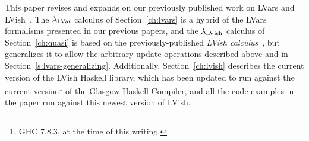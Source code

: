\fi

\ifdefined\JOURNAL

This paper revises and expands on our previously published work on
LVars and LVish~\cite{Freeze-paper, LVars-paper, effectzoo}.
The $\lambda_{\textrm{LVar}}$ calculus of Section~\ref{ch:lvars}
is a hybrid of the LVars formalisms presented in our previous papers,
and the $\lambda_{\textrm{LVish}}$ calculus of Section~\ref{ch:quasi} is based on
the previously-published \emph{LVish calculus}~\cite{Freeze-paper},
but generalizes it to allow the arbitrary update operations  described
above and in Section~\ref{s:lvars-generalizing}.  Additionally, Section~\ref{ch:lvish} describes the current version of the LVish Haskell library, which has been updated to run
against the current version\footnote{GHC 7.8.3, at the time of
  this writing.} of the Glasgow Haskell Compiler, and all the code
examples in the paper run against this newest version of LVish.

\fi
